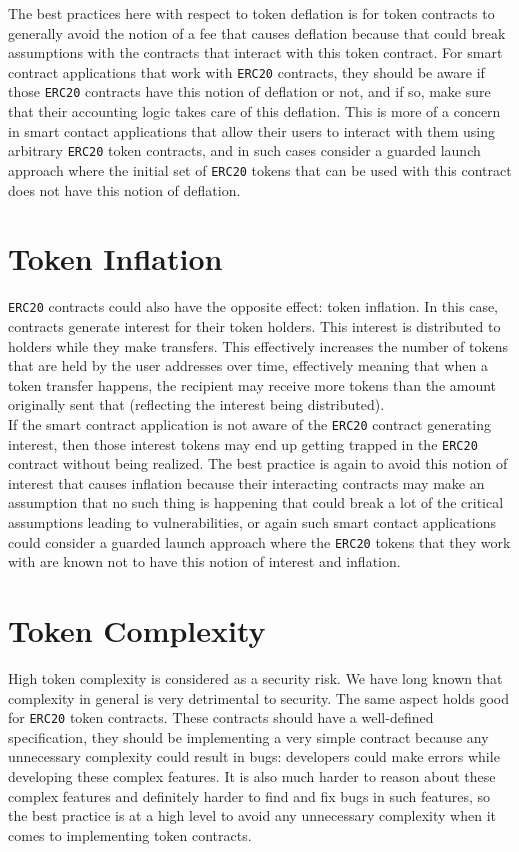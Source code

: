 The best practices here with respect to token deflation is for token contracts to generally avoid the notion of a fee that causes deflation because that could break assumptions with the contracts that interact with this token contract. For smart contract applications that work with \verb|ERC20| contracts, they should be aware if those \verb|ERC20| contracts have this notion of deflation or not, and if so, make sure that their accounting logic takes care of this deflation. This is more of a concern in smart contact applications that allow their users to interact with them using arbitrary \verb|ERC20| token contracts, and in such cases consider a guarded launch approach where the initial set of \verb|ERC20| tokens that can be used with this contract does not have this notion of deflation.

\section{Token Inflation}
\verb|ERC20| contracts could also have the opposite effect: token inflation. In this case, contracts generate interest for their token holders. This interest is distributed to holders while they make transfers. This effectively increases the number of tokens that are held by the user addresses over time, effectively meaning that when a token transfer happens, the recipient may receive more tokens than the amount originally sent that (reflecting the interest being distributed).\\

If the smart contract application is not aware of the \verb|ERC20| contract generating interest, then those interest tokens may end up getting trapped in the \verb|ERC20| contract without being realized. The best practice is again to avoid this notion of interest that causes inflation because their interacting contracts may make an assumption that no such thing is happening that could break a lot of the critical assumptions leading to vulnerabilities, or again such smart contact applications could consider a guarded launch approach where the \verb|ERC20| tokens that they work with are known not to have this notion of interest and inflation.

\section{Token Complexity}
High token complexity is considered as a security risk. We have long known that complexity in general is very detrimental to security. The same aspect holds good for \verb|ERC20| token contracts. These contracts should have a well-defined specification, they should be implementing a very simple contract because any unnecessary complexity could result in bugs: developers could make errors while developing these complex features. It is also much harder to reason about these complex features and definitely harder to find and fix bugs in such features, so the best practice is at a high level to avoid any unnecessary complexity when it comes to implementing token contracts.

